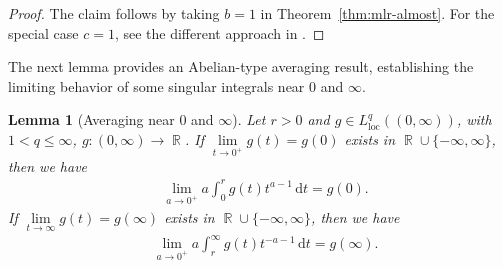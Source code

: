 \documentclass[12pt, reqno]{amsart}%
\theoremstyle{plain}  %
\newtheorem{lemma}[theorem]{Lemma}
\theoremstyle{definition}  %
\theoremstyle{remark}
\numberwithin{equation}{section}
\DeclareMathOperator{\loc}{loc}
\DeclareMathOperator{\R}{\mathbb{R}}
\renewcommand{\d}{\,\mathrm{d}}
\begin{document}
\begin{proof}
The claim follows by taking $b=1$ in Theorem~\ref{thm:mlr-almost}.  For the special case $c = 1$, see the different approach in \cite[Chapter 3]{LeRo21}.

\end{proof}


The next lemma provides an Abelian-type averaging result, establishing the limiting behavior of some singular integrals near $0$ and $\infty$. 
\begin{lemma}
[Averaging  near $0$ and $\infty$]
\label{lem:asymp-averag}
Let $r > 0$ and  $g\in L^q_{\loc}((0,\infty))$, with $1<q\leq \infty$, $g: (0, \infty)\to \R$.
If $\lim\limits_{t \to 0^+} g(t) = g(0)$ exists in $\R\cup \{ -\infty, \infty\}$, then we have
\begin{align*}
&\lim_{a\to0^+} a\int_0^r g(t) t^{a-1}\d t = g(0).
\end{align*}
If $\lim\limits_{t \to \infty} g(t) = g(\infty)$ exists in $\R\cup \{ -\infty, \infty\}$, then we have
\begin{align*}
&\lim_{a\to0^+} a\int_r^\infty g(t) t^{-a-1}\d t= g(\infty).
\end{align*}
\end{lemma}
\end{document}
